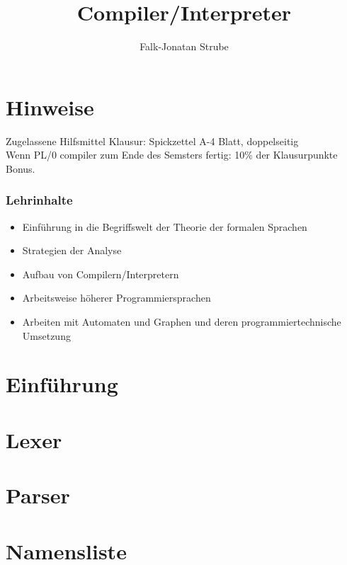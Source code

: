 \documentclass{scrreprt}
\title{Compiler/Interpreter}
\author{Falk-Jonatan Strube}
\begin{document}
\maketitle
\tableofcontents

\chapter*{Hinweise}

Zugelassene Hilfsmittel Klausur: Spickzettel A-4 Blatt, doppelseitig\\
Wenn PL/0 compiler zum Ende des Semsters fertig: 10\% der Klausurpunkte Bonus.

\subsection*{Lehrinhalte}
\begin{itemize}
\item Einführung in die Begriffswelt der Theorie der formalen Sprachen
\item Strategien der Analyse
\item Aufbau von Compilern/Interpretern
\item Arbeitsweise höherer Programmiersprachen
\item Arbeiten mit Automaten und Graphen und deren programmiertechnische Umsetzung
\end{itemize}

\chapter{Einführung}


%

\chapter{Lexer}


\chapter{Parser}


\chapter{Namensliste}

\end{document}
